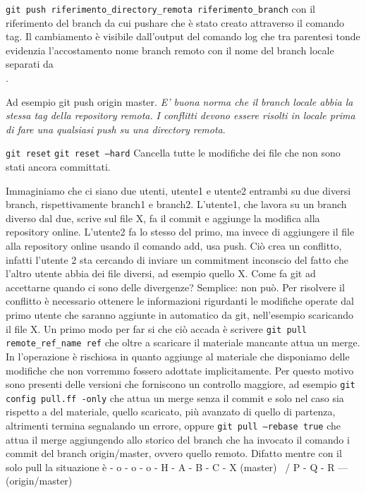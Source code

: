 \texttt{git push riferimento\_directory\_remota riferimento\_branch} con il riferimento del branch da cui pushare che è stato creato attraverso il comando tag. 
Il cambiamento è visibile dall'output del comando log che tra parentesi tonde evidenzia l'accostamento nome branch remoto con il nome del branch locale separati da \\.

Ad esempio git push origin master. \emph{E' buona norma che il branch locale abbia la stessa tag della repository remota.}
\emph{I conflitti devono essere risolti in locale prima di fare una qualsiasi push su una directory remota}.


\texttt{git reset} \texttt{git reset --hard} Cancella tutte le modifiche dei file che non sono stati ancora committati.

Immaginiamo che ci siano due utenti, utente1 e utente2 entrambi su due diversi branch, rispettivamente branch1 e branch2. 
L'utente1, che lavora su un branch diverso dal due, scrive sul  file X, fa il commit e aggiunge la modifica alla repository online.
L'utente2 fa lo stesso del primo, ma invece di aggiungere il file alla repository online usando il comando add, usa push.
Ciò crea un conflitto, infatti l'utente 2 sta cercando di inviare un commitment inconscio del fatto che l'altro utente abbia dei file diversi, ad esempio quello X. 
Come fa git ad accettarne quando ci sono delle divergenze? Semplice: non può. 
Per risolvere il conflitto è necessario ottenere le informazioni rigurdanti le modifiche operate dal primo utente che saranno aggiunte in automatico da git, nell'esempio scaricando il  file X.
Un primo modo per far si che ciò accada  è scrivere \texttt{git pull remote\_ref\_name ref} che oltre a scaricare il materiale mancante attua  un merge. 
In l'operazione è rischiosa in quanto aggiunge al materiale che disponiamo delle modifiche che non vorremmo fossero adottate implicitamente. 
Per questo motivo sono presenti delle versioni che forniscono un controllo maggiore, ad esempio \texttt{git config pull.ff -only} che attua un merge senza il commit e solo nel caso sia rispetto a del materiale, quello scaricato, più avanzato di quello di partenza, altrimenti termina segnalando un errore, oppure \texttt{git pull --rebase true} che attua il merge aggiungendo allo storico del branch che ha invocato il comando i commit del branch origin/master, ovvero quello remoto. 
Difatto mentre con il solo pull la situazione è 
- o - o - o - H - A - B - C - X (master)
               \             /
                P - Q - R --- (origin/master)

